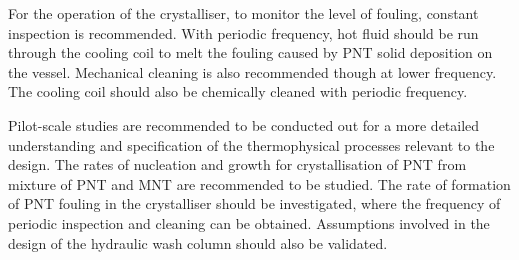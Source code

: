 For the operation of the crystalliser, to monitor the level of fouling, constant inspection is recommended. With periodic frequency, hot fluid should be run through the cooling coil to melt the fouling caused by PNT solid deposition on the vessel. Mechanical cleaning is also recommended though at lower frequency. The cooling coil should also be chemically cleaned with periodic frequency. 

Pilot-scale studies are recommended to be conducted out for a more detailed understanding and specification of the thermophysical processes relevant to the design. The rates of nucleation and growth for crystallisation of PNT from mixture of PNT and MNT are recommended to be studied. The rate of formation of PNT fouling in the crystalliser should be investigated, where the frequency of periodic inspection and cleaning can be obtained. Assumptions involved in the design of the hydraulic wash column should also be validated. 







